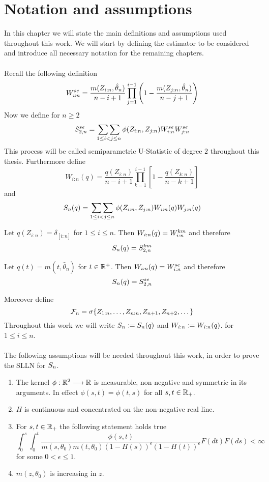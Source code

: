 \chapter{Notation and assumptions}
In this chapter we will state the main definitions and assumptions used throughout this work. We will start by defining the estimator to be considered and introduce all necessary notation for the remaining chapters.\\
\\
Recall the following definition
$$W_{i:n}^{se} = \frac{m(Z_{i:n}, \hat{\theta}_n)}{n-i+1} \prod\limits_{j=1}^{i-1}\left(1-\frac{m(Z_{j:n}, \hat{\theta}_n)}{n-j+1}\right)$$
%
Now we define for $n\geq2$
$$S_{2,n}^{se} = \mathop{\sum\sum}\limits_{1\leq i<j\leq n}\phi(Z_{i:n}, Z_{j:n})W_{i:n}^{se}W_{j:n}^{se}$$
This process will be called semiparametric U-Statistic of degree $2$ throughout this thesis.
%
Furthermore define
$$W_{i:n}(q) = \frac{q(Z_{i:n})}{n-i+1}\prod_{k=1}^{i-1}\left[1-\frac{q(Z_{k:n})}{n-k+1}\right]$$
and 
$$S_{n}(q) = \mathop{\sum\sum}\limits_{1\leq i<j\leq n}\phi(Z_{i:n}, Z_{j:n})W_{i:n}(q)W_{j:n}(q)$$
%
\begin{example}
	Let $q(Z_{i:n}) = \delta_{[i:n]}$ for $1\leq i\leq n$. Then $W_{i:n}(q) = W_{i:n}^{km}$ and therefore 
	$$S_n(q) = S_{2,n}^{km}$$
\end{example}
%
\begin{example}
	Let $q(t) = m(t, \hat\theta_n)$ for $t\in\mathbb{R}^+$. Then $W_{i:n}(q) = W_{i:n}^{se}$ and therefore 
	$$S_n(q) = S_{2,n}^{se}$$
\end{example}
%
\noindent Moreover define
$$\mathcal{F}_n = \sigma\{Z_{1:n}, \dots, Z_{n:n}, Z_{n+1}, Z_{n+2}, \dots\}$$
%
Throughout this work we will write $S_{n} := S_{n}(q)$ and $W_{i:n} := W_{i:n}(q)$.
for $1\leq i\leq n$.\\
\\
%
The following assumptions will be needed throughout this work, in order to prove the SLLN for $S_{n}$.
\begin{enumerate}[({A}1)]
	\item \label{ass:kernel_gen} The kernel $\phi: \mathbb{R}^2 \longrightarrow \mathbb{R}$ is measurable, non-negative and symmetric in its arguments. In effect $\phi(s,t) = \phi(t,s)$ for all $s,t \in \mathbb{R}_+$. 
	\item \label{ass:H_nonneg} $H$ is continuous and concentrated on the non-negative real line.
	\item \label{ass:intgral_phi_q} For $s,t\in \mathbb{R}_+$ the following statement holds true
	$$\int_{0}^{s} \int_{0}^{t} \frac{\phi(s,t)}{m(s, \theta_0)m(t,\theta_0)(1-H(s))^\epsilon(1-H(t))^{\epsilon}} F(dt)F(ds) < \infty$$
	for some $0<\epsilon\leq 1$.
	\item \label{ass:m_increas} $m(z,\theta_0)$ is increasing in $z$.
\end{enumerate}
